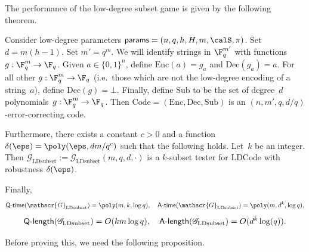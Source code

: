 \documentclass[11pt]{article}
\newcommand{\codec}{\mathrm{Code}}
\newcommand{\codee}{\mathrm{Enc}}
\newcommand{\coded}{\mathrm{Dec}}
\newcommand{\codes}{\mathrm{Sub}}
\newcommand{\params}{\mathsf{params}}
\newcommand{\game}{\mathscr{G}}
\newcommand{\qtime}[1]{\mathsf{Q}\textnormal{-}\mathsf{time}(#1)}
\newcommand{\atime}[1]{\mathsf{A}\textnormal{-}\mathsf{time}(#1)}
\newcommand{\qlength}[1]{\mathsf{Q}\textnormal{-}\mathsf{length}(#1)}
\newcommand{\alength}[1]{\mathsf{A}\textnormal{-}\mathsf{length}(#1)}
\begin{document}
The performance of the low-degree subset game is given by the following theorem.

\begin{theorem}\label{thm:low-degree-code-tester}
Consider low-degree parameters $\params = (n, q, h, H, m, \calS, \pi)$. Set $d = m(h-1)$.
Set $m' = q^m$.  We will identify strings in $\F_q^{m'}$ with functions $g:\F_q^m \rightarrow \F_q$.
Given $a \in \{0, 1\}^n$, define $\codee(a) = g_a$ and $\coded(g_a) = a$.
For all other $g:\F_q^m \rightarrow \F_q$ (i.e.\ those which are not the low-degree encoding of a string~$a$),
define $\coded(g) = \bot$.
Finally, define $\codes$ to be the set of degree~$d$ polynomials~$g:\F_q^m \rightarrow\F_q$.
Then $\codec = (\codee, \coded, \codes)$ is an $(n, m', q, d/q)$-error-correcting code.

Furthermore, there exists a constant $c > 0$ and a function $\delta(\eps) = \poly(\eps, dm/q^c)$ such that the following holds.
Let~$k$ be an integer.
Then $\game_{\mathrm{LDsubset}} := \game_{\mathrm{LDsubset}}(m, q, d, \cdot)$ is a $k$-subset tester for $\mathrm{LDCode}$ with robustness $\delta(\eps)$.

Finally,
\begin{equation*}
\qtime{\game_{\mathrm{LDsubset}}} = \poly(m, k,\log q),
\quad
\atime{\game_{\mathrm{LDsubset}}} = \poly(m, d^k, \log q),
\end{equation*}
\begin{equation*}
\qlength{\game_{\mathrm{LDsubset}}} = O(k m \log q),
\quad
\alength{\game_{\mathrm{LDsubset}}} = O(d^k \log (q)).
\end{equation*}
\end{theorem}

Before proving this, we need the following proposition.
\end{document}
